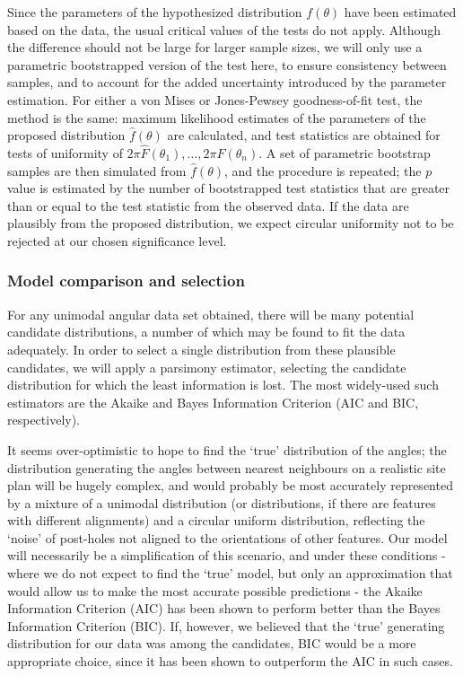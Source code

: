 \documentclass[../../ArchStats.tex]{subfiles}
\begin{document}
Since the parameters of the hypothesized distribution $f(\theta)$ have been estimated based on the data, the usual critical values of the tests do not apply. Although the difference should not be large for larger sample sizes, we will only use a parametric bootstrapped version of the test here, to ensure consistency between samples, and to account for the added uncertainty introduced by the parameter estimation. For either a von Mises or Jones-Pewsey goodness-of-fit test, the method is the same: maximum likelihood estimates of the parameters of the proposed distribution $\hat{f}(\theta)$ are calculated, and test statistics are obtained for tests of uniformity of $2\pi \hat{F}(\theta_1), \dots, 2\pi \hat{F}(\theta_n)$. A set of parametric bootstrap samples are then simulated from $\hat{f}(\theta)$, and the procedure is repeated; the $p$ value is estimated by the number of bootstrapped test statistics that are greater than or equal to the test statistic from the observed data. If the data are plausibly from the proposed distribution, we expect circular uniformity not to be rejected at our chosen significance level.


\subsubsection{Model comparison and selection}
\label{sec:AIC}

For any unimodal angular data set obtained, there will be many potential candidate distributions, a number of which may be found to fit the data adequately. In order to select a single distribution from these plausible candidates, we will apply a parsimony estimator, selecting the candidate distribution for which the least information is lost. The most widely-used such estimators are the Akaike and Bayes Information Criterion (AIC and BIC, respectively).

It seems over-optimistic to hope to find the `true' distribution of the angles; the distribution generating the angles between nearest neighbours on a realistic site plan will be hugely complex, and would probably be most accurately represented by a mixture of a unimodal distribution (or distributions, if there are features with different alignments) and a circular uniform distribution, reflecting the `noise'  of post-holes not aligned to the orientations of other features. Our model will necessarily be a simplification of this scenario, and under these conditions - where we do not expect to find the `true' model, but only an approximation that would allow us to make the most accurate possible predictions - the Akaike Information Criterion (AIC) has been shown to perform better than the Bayes Information Criterion (BIC)\cite{aho2014}. If, however, we believed that the `true' generating distribution for our data was among the candidates, BIC would be a more appropriate choice, since it has been shown to outperform the AIC in such cases. 
\end{document}
